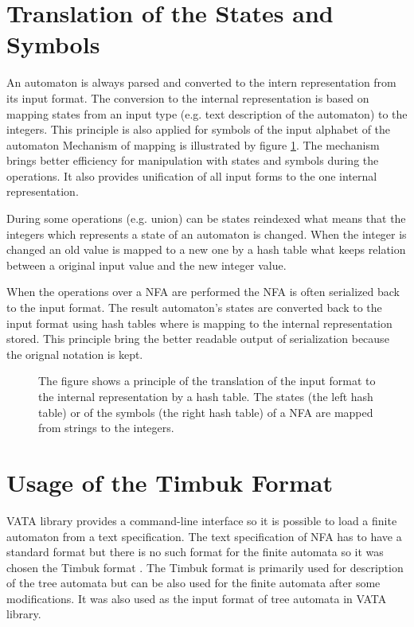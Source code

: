 \section{Translation of the States and Symbols}
\label{sectionTranslate}
An automaton is always parsed and converted to the intern representation from its input format. 
The conversion to the internal representation is based on mapping states from an input type (e.g. text description of the automaton) 
to the integers. This principle is also applied for symbols of the input alphabet of the automaton
Mechanism of mapping is illustrated by figure \ref{figExplicitFADataStr}. 
The mechanism brings better efficiency for manipulation with states and symbols
during the operations. It also provides unification of all input forms to the one internal representation. 

During some operations (e.g. union) can be states reindexed what means that the integers which represents a state of an automaton is changed. When the integer
is changed an old value is mapped to a new one by a hash table what keeps relation between a original input value and the new integer value.

When the operations over a NFA are performed the NFA is often serialized back to the input format. The result 
automaton's states are converted back to the input format using hash tables where is mapping to the internal representation stored. This
principle bring the better readable output of serialization because the orignal notation is kept.

\begin{figure}[bt]
\begin{center}

		\label{figExplicitFADataStr}
    \caption{The figure shows a principle of the translation of the input format to the internal representation by a hash table. 
      The states (the left hash table) or of the symbols (the right hash table) of a NFA are mapped from strings to the integers.}
\end{center}
\end{figure}

\section{Usage of the Timbuk Format}
\label{usageTimbuk}
VATA library provides a command-line interface so it is possible to load a finite automaton from a text specification. 
The text specification of NFA has to have a standard format but there is no such format for the finite automata so it was chosen
the Timbuk format \cite{timbuk}. The Timbuk format is primarily used for description of the tree automata but can be also used for the finite automata
after some modifications. It was also used as the input format of tree automata in VATA library.

